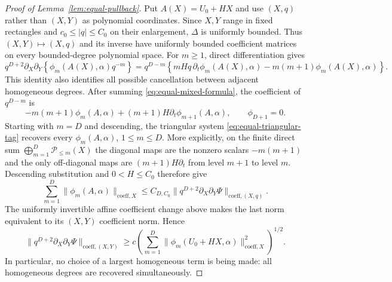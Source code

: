 \documentclass[11pt]{article}
\numberwithin{equation}{section}
\theoremstyle{remark}
\theoremstyle{definition}
\newcommand{\norm}[1]{\lVert #1\rVert}
\begin{document}
\begin{proof}[Proof of Lemma~\ref{lem:equal-pullback}]
Put $A(X)=U_0+HX$ and use $(X,q)$ rather than $(X,Y)$ as polynomial
coordinates.  Since $X,Y$ range in fixed rectangles and
$c_0\le|q|\le C_0$ on their enlargement, $\Delta$ is uniformly bounded.
Thus $(X,Y)\mapsto(X,q)$ and its inverse have uniformly bounded
coefficient matrices on every bounded-degree polynomial space.
For $m\ge1$, direct differentiation gives
\begin{equation}\label{eq:equal-mixed-formula}
 q^{D+2}\partial_X\partial_Y
 \left\{\phi_m(A(X),\alpha)q^{-m}\right\}
 =q^{D-m}\left\{mHq\,\partial_t\phi_m(A(X),\alpha)
      -m(m+1)\phi_m(A(X),\alpha)\right\}.
\end{equation}
This identity also identifies all possible cancellation between adjacent
homogeneous degrees.  After summing \eqref{eq:equal-mixed-formula}, the
coefficient of $q^{D-m}$ is
\begin{equation}\label{eq:equal-triangular-tag}
 -m(m+1)\phi_m(A,\alpha)
 +(m+1)H\partial_t\phi_{m+1}(A,\alpha),
 \qquad \phi_{D+1}=0.
\end{equation}
Starting with $m=D$ and descending, the triangular system
\eqref{eq:equal-triangular-tag} recovers every
$\phi_m(A,\alpha)$, $1\le m\le D$.  More explicitly, on the finite direct
sum $\bigoplus_{m=1}^D\mathcal P_{\le m}(X)$ the diagonal maps are the
nonzero scalars $-m(m+1)$ and the only off-diagonal maps are
$(m+1)H\partial_t$ from level $m+1$ to level $m$.  Descending
substitution and $0<H\le C_0$ therefore give
\[
 \sum_{m=1}^D\norm{\phi_m(A,\alpha)}_{\mathrm{coeff},X}
 \le C_{D,C_0}
 \norm{q^{D+2}\partial_X\partial_Y\Psi}_{\mathrm{coeff},(X,q)}.
\]
The uniformly invertible affine coefficient change above makes the last
norm equivalent to its $(X,Y)$ coefficient norm.  Hence
\begin{equation}\label{eq:equal-mixed-controls-restriction}
 \norm{q^{D+2}\partial_X\partial_Y\Psi}_{\mathrm{coeff},(X,Y)}
 \ge c\left(\sum_{m=1}^D
       \norm{\phi_m(U_0+HX,\alpha)}_{\mathrm{coeff},X}^2\right)^{1/2}.
\end{equation}
In particular, no choice of a largest homogeneous term is being made:
all homogeneous degrees are recovered simultaneously.


\end{proof}
\end{document}

